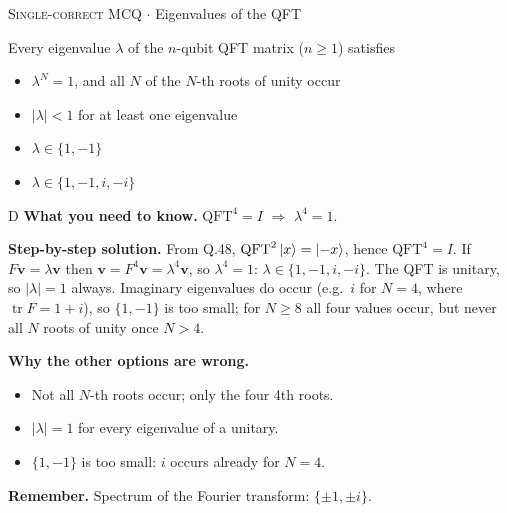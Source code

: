 \documentclass[11pt,a4paper]{article}
\newcommand{\optlabel}[1]{\textbf{(#1)}}
\newcommand{\correctlabel}[1]{\textcolor{okgreen}{\textbf{(#1)}\,\ding{51}}}
\newenvironment{qitem}[1]{\begin{list}{}{\setlength{\leftmargin}{3.3em}\setlength{\labelwidth}{3.1em}%
  \setlength{\labelsep}{0.2em}\setlength{\topsep}{3pt}\setlength{\parsep}{3pt}}\item[\textbf{Q.#1}\hfill]}{\end{list}}
\newcommand{\qsep}{\par\vspace{2pt}{\color{black!15}\hrule}\vspace{4pt}}
\newcommand{\qmeta}[2]{{\footnotesize\color{black!60}\textsc{#1} \;$\cdot$\; #2}\par}
\newcommand{\QFTop}{\mathrm{QFT}}
\begin{document}
\begin{qitem}{73}
\qmeta{Single-correct MCQ}{Eigenvalues of the QFT}
Every eigenvalue $\lambda$ of the $n$-qubit QFT matrix ($n \ge 1$) satisfies
\begin{itemize}[leftmargin=2.6em, labelsep=0.4em, itemsep=2pt, topsep=3pt]
\item[\optlabel{A}] $\lambda^{N} = 1$, and all $N$ of the $N$-th roots of unity occur
\item[\optlabel{B}] $|\lambda| < 1$ for at least one eigenvalue
\item[\optlabel{C}] $\lambda \in \{1, -1\}$
\item[\correctlabel{D}] $\lambda \in \{1, -1, i, -i\}$
\end{itemize}
\end{qitem}
\begin{solbox}{D}
\textbf{\color{brand}What you need to know.} $\QFTop^4 = I$ $\Rightarrow$ $\lambda^4 = 1$.

\textbf{\color{brand}Step-by-step solution.} From Q.48, $\mathrm{QFT}^2\ket x = \ket{-x}$, hence $\mathrm{QFT}^4 = I$. If $F\mathbf v = \lambda\mathbf v$ then
$\mathbf v = F^4\mathbf v = \lambda^4\mathbf v$, so $\lambda^4 = 1$: $\lambda \in \{1, -1, i, -i\}$. The QFT is unitary, so $|\lambda| = 1$
always. Imaginary eigenvalues do occur (e.g.\ $i$ for $N = 4$, where $\operatorname{tr}F = 1 + i$), so $\{1, -1\}$ is too small;
for $N \ge 8$ all four values occur, but never all $N$ roots of unity once $N > 4$.

\textbf{\color{brand}Why the other options are wrong.}
\begin{itemize}[leftmargin=2.4em, itemsep=1pt, topsep=2pt]
\item[\textbf{(A)}] Not all $N$-th roots occur; only the four 4th roots.
\item[\textbf{(B)}] $|\lambda| = 1$ for every eigenvalue of a unitary.
\item[\textbf{(C)}] $\{1,-1\}$ is too small: $i$ occurs already for $N = 4$.
\end{itemize}
\textbf{\color{brand}Remember.} Spectrum of the Fourier transform: $\{\pm1, \pm i\}$.
\end{solbox}
\qsep
\end{document}
